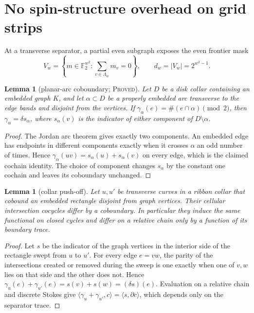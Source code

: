 \documentclass[11pt]{article}
\newtheorem{lemma}[theorem]{Lemma}
\newcommand{\Ftwo}{\mathbb F_2}
\newcommand{\claimtag}[1]{\textsc{#1}}
\newcommand{\proved}{\claimtag{Proved}}
\begin{document}
\section{No spin-structure overhead on grid strips}

At a transverse separator, a partial even subgraph exposes the even frontier
mask
\begin{equation}\label{eq:Vw}
 V_w=\left\{m\in\Ftwo^{w^2}:\sum_{v\in\Lambda_w}m_v=0\right\},
 \qquad d_w=|V_w|=2^{w^2-1}.
\end{equation}

\begin{lemma}[planar-arc coboundary; \proved]\label{lem:planar-arc}
Let \(D\) be a disk collar containing an embedded graph \(K\), and let
\(\alpha\subset D\) be a properly embedded arc transverse to the edge bands
and disjoint from the vertices.  If
\(\gamma_\alpha(e)=\#(e\cap\alpha)\pmod2\), then
\(\gamma_\alpha=\delta s_\alpha\), where \(s_\alpha(v)\) is the indicator of
either component of \(D\setminus\alpha\).
\end{lemma}

\begin{proof}
The Jordan arc theorem gives exactly two components.  An embedded edge has
endpoints in different components exactly when it crosses \(\alpha\) an odd
number of times.  Hence
\(\gamma_\alpha(uv)=s_\alpha(u)+s_\alpha(v)\) on every edge, which is the
claimed cochain identity.  The choice of component changes \(s_\alpha\) by
the constant one cochain and leaves its coboundary unchanged.
\end{proof}

\begin{lemma}[collar push-off]\label{lem:collar-push-off}
Let \(u,u'\) be transverse curves in a ribbon collar that cobound an embedded
rectangle disjoint from graph vertices.  Their cellular intersection
cocycles differ by a coboundary.  In particular they induce the same
functional on closed cycles and differ on a relative chain only by a
function of its boundary trace.
\end{lemma}

\begin{proof}
Let \(s\) be the indicator of the graph vertices in the interior side of the
rectangle swept from \(u\) to \(u'\).  For every edge \(e=vw\), the parity of
the intersections created or removed during the sweep is one exactly when
one of \(v,w\) lies on that side and the other does not.  Hence
\(\gamma_u(e)+\gamma_{u'}(e)=s(v)+s(w)=(\delta s)(e)\).
Evaluation on a relative chain and discrete Stokes give
\(\langle\gamma_u+
\gamma_{u'},c\rangle=\langle s,\partial c\rangle\), which depends only on
the separator trace.
\end{proof}
\end{document}

